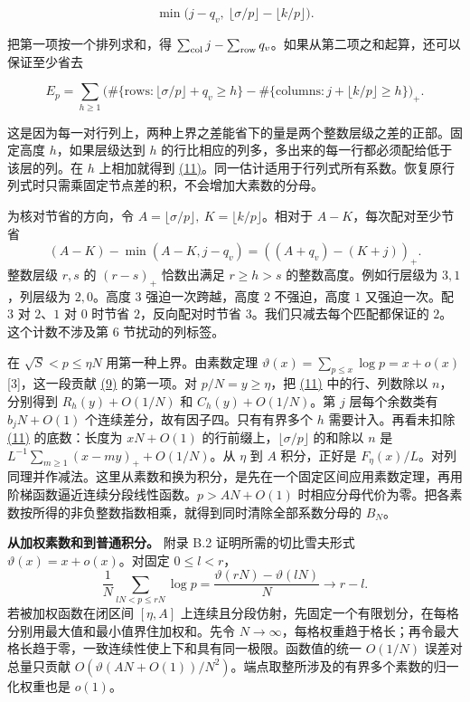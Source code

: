 \documentclass[11pt,a4paper]{article}
\begin{document}
\[
 \min\big(j-q_v,\ \lfloor\sigma/p\rfloor-\lfloor k/p\rfloor\big).
\]

把第一项按一个排列求和，得 \(\sum_{\rm col}j-\sum_{\rm row}q_v\)。如果从第二项之和起算，还可以保证至少省去

\[
 E_p=\sum_{h\ge1}
 \big(\#\{\text{rows}:\lfloor\sigma/p\rfloor+q_v\ge h\}
       -\#\{\text{columns}: j+\lfloor k/p\rfloor\ge h\}\big)_+ .          \tag{11}\label{eq:11}
\]

这是因为每一对行列上，两种上界之差能省下的量是两个整数层级之差的正部。固定高度 \(h\)，如果层级达到 \(h\) 的行比相应的列多，多出来的每一行都必须配给低于该层的列。在 \(h\) 上相加就得到 \hyperref[eq:11]{(11)}。同一估计适用于行列式所有系数。恢复原行列式时只需乘固定节点差的积，不会增加大素数的分母。

为核对节省的方向，令 \(A=\lfloor\sigma/p\rfloor,\ K=\lfloor k/p\rfloor\)。相对于 \(A-K\)，每次配对至少节省 \[
 (A-K)-\min(A-K,j-q_v)=((A+q_v)-(K+j))_+ .
\] 整数层级 \(r,s\) 的 \((r-s)_+\) 恰数出满足 \(r\ge h>s\) 的整数高度。例如行层级为 \(3,1\)，列层级为 \(2,0\)。高度 \(3\) 强迫一次跨越，高度 \(2\) 不强迫，高度 \(1\) 又强迫一次。配 \(3\) 对 \(2\)、\(1\) 对 \(0\) 时节省 \(2\)，反向配对时节省 \(3\)。我们只减去每个匹配都保证的 \(2\)。这个计数不涉及第 6 节扰动的列标签。

在 \(\sqrt S<p\le\eta N\) 用第一种上界。由素数定理 \(\vartheta(x)=\sum_{p\le x}\log p=x+o(x)\) {[}3{]}，这一段贡献 \hyperref[eq:9]{(9)} 的第一项。对 \(p/N=y\ge\eta\)，把 \hyperref[eq:11]{(11)} 中的行、列数除以 \(n\)，分别得到 \(R_h(y)+O(1/N)\) 和 \(C_h(y)+O(1/N)\)。第 \(j\) 层每个余数类有 \(b_jN+O(1)\) 个连续差分，故有因子四。只有有界多个 \(h\) 需要计入。再看未扣除 \hyperref[eq:11]{(11)} 的底数：长度为 \(xN+O(1)\) 的行前缀上，\(\lfloor\sigma/p\rfloor\) 的和除以 \(n\) 是 \(L^{-1}\sum_{m\ge1}(x-my)_++O(1/N)\)。从 \(\eta\) 到 \(A\) 积分，正好是 \(F_\eta(x)/L\)。对列同理并作减法。这里从素数和换为积分，是先在一个固定区间应用素数定理，再用阶梯函数逼近连续分段线性函数。\(p>AN+O(1)\) 时相应分母代价为零。把各素数按所得的非负整数指数相乘，就得到同时清除全部系数分母的 \(B_N\)。

\textbf{从加权素数和到普通积分。} 附录 B.2 证明所需的切比雪夫形式 \(\vartheta(x)=x+o(x)\)。对固定 \(0\le l<r\)， \[
 \frac1N\sum_{lN<p\le rN}\log p
 =\frac{\vartheta(rN)-\vartheta(lN)}N\longrightarrow r-l .
\] 若被加权函数在闭区间 \([\eta,A]\) 上连续且分段仿射，先固定一个有限划分，在每格分别用最大值和最小值界住加权和。先令 \(N\to\infty\)，每格权重趋于格长；再令最大格长趋于零，一致连续性使上下和具有同一极限。函数值的统一 \(O(1/N)\) 误差对总量只贡献 \(O(\vartheta(AN+O(1))/N^2)\)。端点取整所涉及的有界多个素数的归一化权重也是 \(o(1)\)。
\end{document}
